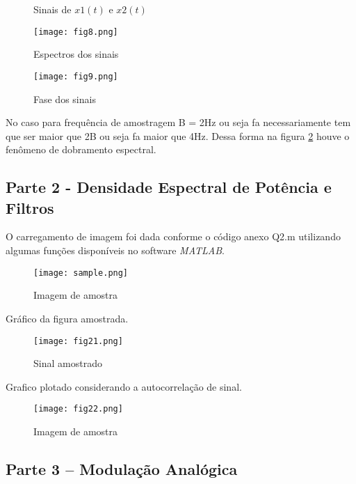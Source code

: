 \documentclass[a4paper]{article}
\begin{document}
\begin{enumerate}
\begin{figure}[!hr]
				\caption{Sinais de $x1(t)$ e $x2(t)$}
				\label{fig7}
			\end{figure}
			\begin{figure}[!hl]
				\centering
				\texttt{[image: fig8.png]}
				\caption{Espectros dos sinais}
				\label{fig8}
			\end{figure}
			\begin{figure}[!hr]
				\centering
				\texttt{[image: fig9.png]}
				\caption{Fase dos sinais}
				\label{fig9}
			\end{figure}
			No caso para frequência de amostragem B = 2Hz ou seja fa necessariamente tem que ser maior que 2B ou seja fa maior que 4Hz. Dessa forma na figura \ref{fig8} houve o fenômeno de dobramento espectral.
		\end{enumerate}
\subsection{Parte 2 - Densidade Espectral de Potência e Filtros}
	O carregamento de imagem foi dada conforme o código anexo Q2.m utilizando algumas funções disponíveis no software \textit{MATLAB}.
	\begin{figure}[!hr]
		\centering
		\texttt{[image: sample.png]}
		\caption{Imagem de amostra}
		\label{sample1}
	\end{figure}
	Gráfico da figura amostrada.
	\begin{figure}[!hr]
		\centering
		\texttt{[image: fig21.png]}
		\caption{Sinal amostrado}
		\label{sample2}
	\end{figure}
	Grafico plotado considerando a autocorrelação de sinal.
	\begin{figure}[!hr]
		\centering
		\texttt{[image: fig22.png]}
		\caption{Imagem de amostra}
		\label{sample3}
	\end{figure}
	



\subsection{Parte 3 – Modulação Analógica}
\end{document}
